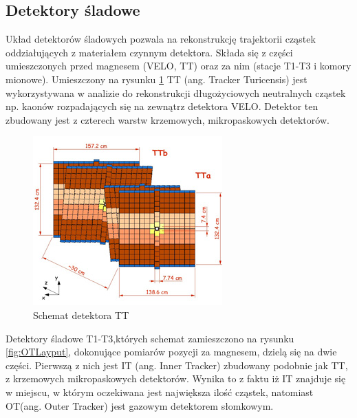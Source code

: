 \subsection{Detektory śladowe}
Układ detektorów śladowych pozwala na rekonstrukcję trajektorii cząstek oddziałujących z materiałem czynnym detektora. Składa się z części umieszczonych przed magnesem (VELO, TT) oraz za nim (stacje T1-T3 i komory mionowe). Umieszczony na rysunku \ref{fig:TTlayout} TT (ang. Tracker Turicensis) jest wykorzystywana w analizie do rekonstrukcji długożyciowych neutralnych cząstek np. kaonów rozpadających się na zewnątrz detektora VELO. Detektor ten zbudowany jest z czterech warstw krzemowych, mikropaskowych detektorów. 
\begin{figure}[th]
  \centering
  \includegraphics[scale=1]{rozdzial2/TT-layout.jpg}
  \caption{Schemat detektora TT \cite{public}}
  \label{fig:TTlayout}
\end{figure}
Detektory śladowe T1-T3,których schemat zamieszczono na rysunku \ref{fig:OTLayput},  dokonujące pomiarów pozycji za magnesem, dzielą się na dwie części. Pierwszą z nich jest IT (ang. Inner Tracker) zbudowany podobnie jak TT, z krzemowych mikropaskowych detektorów. Wynika to z faktu iż IT znajduje się w miejscu, w którym oczekiwana jest największa ilość cząstek, natomiast OT(ang. Outer Tracker) jest gazowym detektorem słomkowym.

